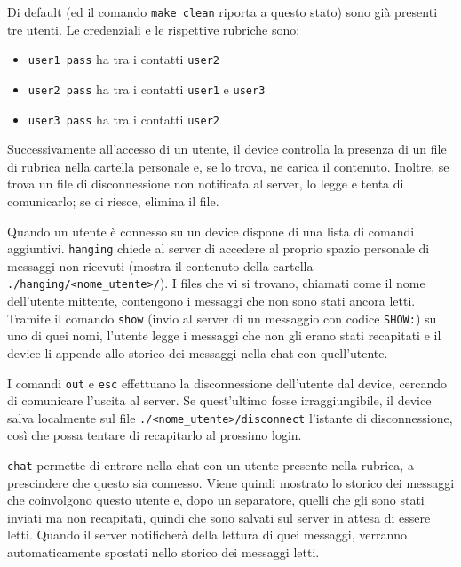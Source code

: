 \documentclass[11pt,a4paper,twocolumn,twoside]{paper}
\begin{document}
    Di default (ed il comando \texttt{make\ clean} riporta a questo
    stato) sono già presenti tre utenti. Le credenziali e le rispettive
    rubriche sono:
    \begin{itemize}[leftmargin=4mm, noitemsep]
      \item\texttt{user1\ pass} ha tra i contatti \texttt{user2}
      \item\texttt{user2\ pass} ha tra i contatti \texttt{user1} e \texttt{user3}
      \item\texttt{user3\ pass} ha tra i contatti \texttt{user2}
    \end{itemize}
    Successivamente all'accesso di un utente, il device controlla la
    presenza di un file di rubrica nella cartella personale e, se lo
    trova, ne carica il contenuto. Inoltre, se trova un file di
    disconnessione non notificata al server, lo legge e tenta di
    comunicarlo; se ci riesce, elimina il file.

    Quando un utente è connesso su un device dispone di una lista di
    comandi aggiuntivi. \texttt{hanging} chiede al server di accedere al
    proprio spazio personale di messaggi non ricevuti
    (mostra il contenuto della cartella
    \texttt{./hanging/\textless{}nome\_utente\textgreater{}/}). I files
    che vi si trovano, chiamati come il nome dell'utente mittente,
    contengono i messaggi che non sono stati ancora letti. Tramite il
    comando \texttt{show} (invio al server di un messaggio con codice
    \texttt{SHOW:}) su uno di quei nomi, l'utente legge i messaggi che
    non gli erano stati recapitati e il device li appende allo storico
    dei messaggi nella chat con quell'utente.

	I comandi \texttt{out} e \texttt{esc} effettuano la disconnessione
	dell'utente dal device, cercando di comunicare l'uscita al server.
	Se quest'ultimo fosse irraggiungibile, il device salva localmente
	sul file \texttt{./\textless{}nome\_utente\textgreater{}/disconnect}
	l'istante di disconnessione, così che possa tentare di recapitarlo
	al prossimo login.

    \texttt{chat} permette di entrare nella chat con un utente presente
    nella rubrica, a prescindere che questo sia connesso. Viene quindi
    mostrato lo storico dei messaggi che coinvolgono questo utente e,
    dopo un separatore, quelli che gli sono stati inviati ma non
    recapitati, quindi che sono salvati sul server in attesa di essere
    letti. Quando il server notificherà della lettura di quei messaggi,
    verranno automaticamente spostati nello storico dei messaggi letti.
\end{document}
